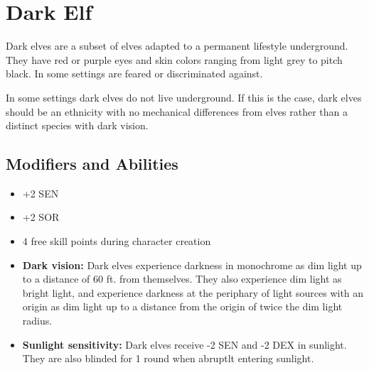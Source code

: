 \section{Dark Elf}\label{dark-elf}
Dark elves are a subset of elves adapted to a permanent lifestyle underground.
They have red or purple eyes and skin colors ranging from light grey to pitch
black. In some settings are feared or discriminated against.

In some settings dark elves do not live underground. If this is the case, dark
elves should be an ethnicity with no mechanical differences from elves rather
than a distinct species with dark vision.

\subsection*{Modifiers and Abilities}
\begin{itemize}
    \item +2 SEN
    \item +2 SOR
    \item 4 free skill points during character creation
    \item \textbf{Dark vision:} Dark elves experience darkness in monochrome as
        dim light up to a distance of 60 ft. from themselves. They also
        experience dim light as bright light, and experience darkness at the
        periphary of light sources with an origin as dim light up to a distance
        from the origin of twice the dim light radius.
    \item \textbf{Sunlight sensitivity:} Dark elves receive -2 SEN and -2 DEX
        in sunlight. They are also blinded for 1 round when abruptlt entering
        sunlight.
\end{itemize}
